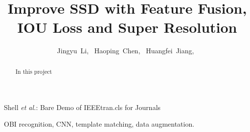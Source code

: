 \documentclass[journal,conference]{IEEEtran}
\begin{document}
\newcommand{\code}[1]{\colorbox[rgb]{0.95,0.95,0.95}{#1}}

%
\title{Improve SSD with Feature Fusion, \\IOU Loss and Super Resolution}
%
%
%

\author{
  Jingyu~Li,~
  Haoping~Chen,~
  Huangfei~Jiang,~
}

%
{Shell \MakeLowercase{\textit{et al.}}: Bare Demo of IEEEtran.cls for Journals}
%


\maketitle

\begin{abstract}
  In this project
\end{abstract}

\begin{IEEEkeywords}
  OBI recognition, CNN, template matching, data augmentation.
\end{IEEEkeywords}
\end{document}

